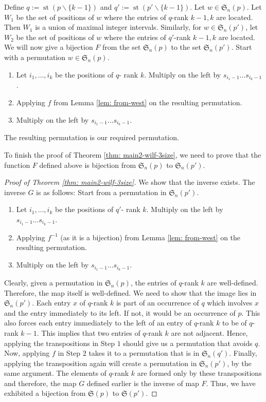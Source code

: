 \documentclass[12pt, english, a4paper]{article}
\newcommand{\Av}{\mathfrak{S}}
\DeclareMathOperator{\st}{st}
\theoremstyle{plain}
\theoremstyle{definition}
\theoremstyle{remark}
\begin{document}
    Define $q:=\st(p\backslash \{k-1\})$ and $q':=\st(p'\backslash \{k-1\})$.
    Let $w\in \Av_n(p)$. Let $W_1$ be the set of positions of $w$ where the entries of $q$-rank $k-1,k$ are located. Then $W_1$ is a union of maximal integer intervals.
    Similarly, for $w\in \Av_n(p')$, let $W_2$ be the set of positions of $w$ where the entries of $q'$-rank $k-1,k$ are located.
    We will now give a bijection $F$ from the set $\Av_n(p)$ to the set $\Av_n(p')$. Start with a permutation $w\in \Av_n(p)$.
    \begin{enumerate} 
        \item Let $i_1,\dots,i_k$ be the positions of $q$- rank $k$. Multiply on the left by $s_{i_1-1}\dots s_{i_k-1}$.
        \item Applying $f$ from Lemma \ref{lem: from-west} on the resulting permutation.
        \item Multiply on the left by $s_{i_1-1}\dots s_{i_k-1}$.
    \end{enumerate}
    The resulting permutation is our required permutation.

    To finish the proof of Theorem \ref{thm: main2-wilf-3size}, we need to prove that the function $F$ defined above is bijection from $\Av_n(p)$ to $\Av_n(p')$.     
\begin{proof}[Proof of Theorem \ref{thm: main2-wilf-3size}]
    We show that the inverse exists. The inverse $G$ is as follows: Start from a permutation in $\Av_n(p')$.
    \begin{enumerate} 
        \item Let $i_1,\dots,i_k$ be the positions of $q'$- rank $k$. Multiply on the left by $s_{i_1-1}\dots s_{i_k-1}$.
        \item Applying $f^{-1}$ (as it is a bijection) from Lemma \ref{lem: from-west} on the resulting permutation.
        \item Multiply on the left by $s_{i_1-1}\dots s_{i_k-1}$.
    \end{enumerate}
    
Clearly, given a permutation in $\Av_n(p)$, the entries of $q$-rank $k$ are well-defined. Therefore, the map itself is well-defined. We need to show that the image lies in $\Av_n(p')$. Each entry $x$ of $q$-rank $k$ is part of an occurrence of $q$ which involves $x$ and the entry immediately to its left. If not, it would be an occurrence of $p$. This also forces each entry immediately to the left of an entry of $q$-rank $k$ to be of $q$-rank $k-1$. This implies that two entries of $q$-rank $k$ are not adjacent. Hence, applying the transpositions in Step $1$ should give us a permutation that avoids $q$. Now, applying $f$ in Step $2$ takes it to a permutation that is in $\Av_n(q')$. Finally, applying the transposition again will create a permutation in $\Av_n(p')$, by the same argument. The elements of $q$-rank $k$ are formed only by these transpositions and therefore, the map $G$ defined earlier is the inverse of map $F$. Thus, we have exhibited a bijection from $\Av(p)$ to $\Av(p')$.
\end{proof}
\end{document}
